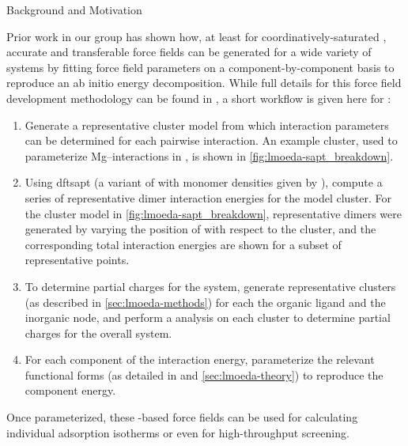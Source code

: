 \begin{section}{Background and Motivation}
\label{sec:lmoeda-background}

Prior work in our group has shown how, at least for coordinatively-saturated \mofs,
accurate and transferable force fields can be generated for a wide variety of
systems by fitting force field parameters on a component-by-component basis to
reproduce an ab initio \sapt energy
decomposition.\cite{McDaniel2012,McDaniel2012a} 
While full details for this force field development methodology can be found
in , a short workflow is given here for
\mgmof:
%
\begin{enumerate}
\item 
Generate a representative cluster model
from which interaction parameters can be determined for each pairwise
interaction.
An example cluster, used to parameterize Mg--\co interactions in \mgmof, is
shown in \cref{fig:lmoeda-sapt_breakdown}.
%
\item 
Using \acrshort{dftsapt} (a variant of \sapt with monomer densities given
by \dft), compute a series of representative dimer interaction energies for the model
cluster. For the cluster model in \cref{fig:lmoeda-sapt_breakdown},
representative dimers were generated by varying the position of \co with
respect to the \mof cluster, and the corresponding \dftsapt total interaction
energies are shown for a subset of representative points.
%
\item
To determine partial charges for the system, generate representative clusters
(as described in \cref{sec:lmoeda-methods}) for each the organic ligand and
the inorganic node, and perform a \dma analysis on each cluster to determine
partial charges for the overall system.
%
\item 
For each component of the \dftsapt interaction energy, 
parameterize the relevant functional forms (as detailed in  and
\cref{sec:lmoeda-theory}) to reproduce the \dftsapt component energy.
\end{enumerate}
%
Once parameterized, these \sapt-based \mof force fields can be used
for calculating individual adsorption isotherms or even for high-throughput
screening.\cite{McDaniel2015} 


\end{section}
